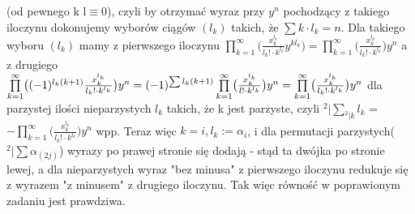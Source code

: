 \documentclass{article}
\begin{document}
(od pewnego k l$\equiv$0), czyli by otrzymać wyraz przy $y^n$ pochodzący z takiego iloczynu dokonujemy wyborów ciągów $(l_k)$ takich, że $\sum k\cdot l_k=n$.\newline
Dla takiego wyboru $(l_k)$ mamy z pierwszego iloczynu $\prod\limits_{k=1}^{\infty}\bigl(\frac{x_k^{l_k}}{l_k!\cdot k^{l_k}}y^{kl_{k}}\bigr)=\prod\limits_{k=1}^{\infty}\bigl(\frac{x_k^{l_k}}{l_k!\cdot k^{l_k}}\bigr)y^n$\newline
a z drugiego $\prod\limits_{k=1}^{\infty}\bigl((-1)^{l_k(k+1)}\frac{x_k^{l_k}}{l_k!\cdot k^{l_k}}\bigr)y^n=(-1)^{\sum l_k(k+1)}\prod\limits_{k=1}^{\infty}\bigl(\frac{x_k^{l_k}}{l!\cdot k^{l_k}}\bigr)y^n\newline
=\prod\limits_{k=1}^{\infty}\bigl(\frac{x_k^{l_k}}{l_k!\cdot k^{l_k}}\bigr)y^n$ dla parzystej ilości nieparzystych $l_k$ takich, że k jest parzyste, czyli $^2|\sum\limits_{^2|k} l_k$\newline
=$-\prod\limits_{k=1}^{\infty}\bigl(\frac{x_k^{l_k}}{l_k!\cdot k^{l_k}}\bigr)y^n$ wpp.\newline
Teraz więc $k=i,l_k:=\alpha_i$, i dla permutacji parzystych($^2|\sum \alpha_{(2j)}$) wyrazy po prawej stronie się dodają - stąd ta dwójka po stronie lewej, a dla nieparzystych wyraz "bez minusa"
z pierwszego iloczynu redukuje się z wyrazem "z minusem" z drugiego iloczynu.\newline
Tak więc równość w poprawionym zadaniu jest prawdziwa.
\end{document}
